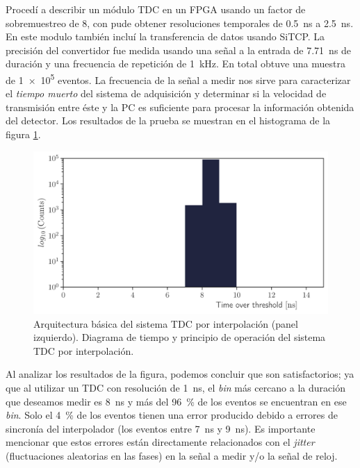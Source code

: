 Procedí a describir un módulo TDC en un FPGA usando un factor de sobremuestreo de \num{8}, con  pude obtener resoluciones temporales de \SI{0.5}{\nano\second} a \SI{2.5}{\nano\second}. En este modulo también incluí la transferencia de datos usando SiTCP. La precisión del convertidor fue medida usando una señal a la entrada de \SI{7.71}{\nano\second} de duración y una frecuencia de repetición de \SI{1}{\kilo\hertz}. En total obtuve una muestra de \num{1e5} eventos. La frecuencia de la señal a medir nos sirve para caracterizar el \emph{tiempo muerto} del sistema de adquisición y determinar si la velocidad de transmisión entre éste y la PC es suficiente para procesar la información obtenida del detector. Los resultados de la prueba se muestran en el histograma de la figura \ref{fig:tdc-lvds}.

\begin{figure}
        \centering
        \includegraphics[width=\textwidth]{tot-lvds.pdf}
        \caption{Arquitectura básica del sistema TDC por interpolación (panel izquierdo). Diagrama de tiempo y principio de operación del sistema TDC por interpolación.}
        \label{fig:tdc-lvds}
\end{figure}

Al analizar los resultados de la figura, podemos concluir que son satisfactorios; ya que al utilizar un TDC con resolución de \SI{1}{\nano\second}, el \emph{bin} más cercano a la duración que deseamos medir es \SI{8}{\nano\second} y más del \SI{96}{\percent} de los eventos se encuentran en ese \emph{bin}. Solo el \SI{4}{\percent} de los eventos tienen una error producido debido a errores de sincronía del interpolador (los eventos entre \SI{7}{\nano\second} y \SI{9}{\nano\second}). Es importante mencionar que estos errores están directamente relacionados con el \emph{jitter} (fluctuaciones aleatorias en las fases) en la señal a medir y/o la señal de reloj.

